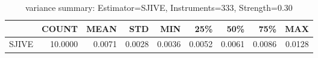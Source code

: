 \begin{table}[ht]
\centering
\caption{variance summary: Estimator=SJIVE, Instruments=333, Strength=0.30}
\begin{tabular}{lrrrrrrrr}
\toprule
 & COUNT & MEAN & STD & MIN & 25\% & 50\% & 75\% & MAX \\
\midrule
SJIVE & 10.0000 & 0.0071 & 0.0028 & 0.0036 & 0.0052 & 0.0061 & 0.0086 & 0.0128 \\
\bottomrule
\end{tabular}
\end{table}
